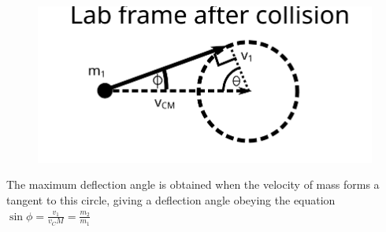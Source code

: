 \begin{problem}
{\begin{figure}[h]
\centering
\includegraphics[width=1.0\textwidth]{../../../figures/dynamics_lab_frame_deflection.svg}
\caption{}
\label{fig:dynamics_lab_frame_deflection}
\end{figure}

 The maximum deflection angle is obtained when the velocity of mass  forms a tangent to this circle, giving a deflection angle \vari{\phi} obeying the equation $\sin{\phi} =  \frac{v_1}{v_CM} = \frac{m_2}{m_1}$ }%
\end{problem}

